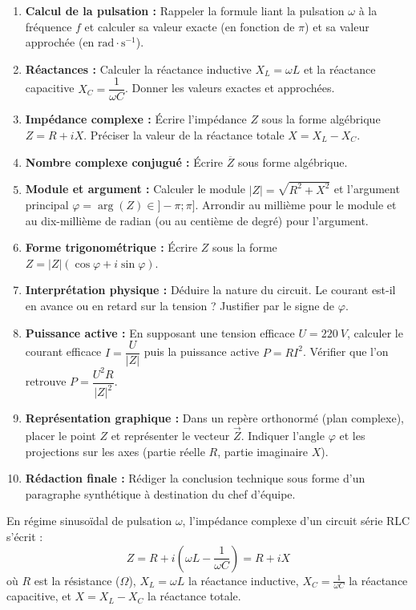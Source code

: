 \documentclass[11pt]{article}
\newcounter{popsec}
\newcounter{popsub}
\newcommand{\courssub}[1]{%
  \stepcounter{popsub}%
  \par\vspace{9pt}\noindent{\popxbold\fontsize{11.5}{13}\selectfont\color{popink}{\color{poporange}\thepopsec.\thepopsub}\hspace{6pt}#1}\par\nopagebreak\vspace{4pt}
}
\begin{document}
\begin{enumerate}
    \item \textbf{Calcul de la pulsation :} Rappeler la formule liant la pulsation $\omega$ à la fréquence $f$ et calculer sa valeur exacte (en fonction de $\pi$) et sa valeur approchée (en $\text{rad}\cdot\text{s}^{-1}$).
    \item \textbf{Réactances :} Calculer la réactance inductive $X_L = \omega L$ et la réactance capacitive $X_C = \dfrac{1}{\omega C}$. Donner les valeurs exactes et approchées.
    \item \textbf{Impédance complexe :} Écrire l'impédance $Z$ sous la forme algébrique $Z = R + iX$. Préciser la valeur de la réactance totale $X = X_L - X_C$.
    \item \textbf{Nombre complexe conjugué :} Écrire $\overline{Z}$ sous forme algébrique.
    \item \textbf{Module et argument :} Calculer le module $|Z| = \sqrt{R^2 + X^2}$ et l'argument principal $\varphi = \arg(Z) \in ]-\pi; \pi]$. Arrondir au millième pour le module et au dix-millième de radian (ou au centième de degré) pour l'argument.
    \item \textbf{Forme trigonométrique :} Écrire $Z$ sous la forme $Z = |Z|(\cos\varphi + i\sin\varphi)$.
    \item \textbf{Interprétation physique :} Déduire la nature du circuit. Le courant est-il en avance ou en retard sur la tension ? Justifier par le signe de $\varphi$.
    \item \textbf{Puissance active :} En supposant une tension efficace $U = \SI{220}{V}$, calculer le courant efficace $I = \dfrac{U}{|Z|}$ puis la puissance active $P = R I^2$. Vérifier que l'on retrouve $P = \dfrac{U^2 R}{|Z|^2}$.
    \item \textbf{Représentation graphique :} Dans un repère orthonormé (plan complexe), placer le point $Z$ et représenter le vecteur $\vec{Z}$. Indiquer l'angle $\varphi$ et les projections sur les axes (partie réelle $R$, partie imaginaire $X$).
    \item \textbf{Rédaction finale :} Rédiger la conclusion technique sous forme d'un paragraphe synthétique à destination du chef d'équipe.
\end{enumerate}

\courssub{Ressources à mobiliser}

\begin{propriete}
En régime sinusoïdal de pulsation $\omega$, l'impédance complexe d'un circuit série RLC s'écrit :
\[ Z = R + i\left(\omega L - \frac{1}{\omega C}\right) = R + iX \]
où $R$ est la résistance ($\Omega$), $X_L = \omega L$ la réactance inductive, $X_C = \frac{1}{\omega C}$ la réactance capacitive, et $X = X_L - X_C$ la réactance totale.
\end{propriete}
\end{document}
